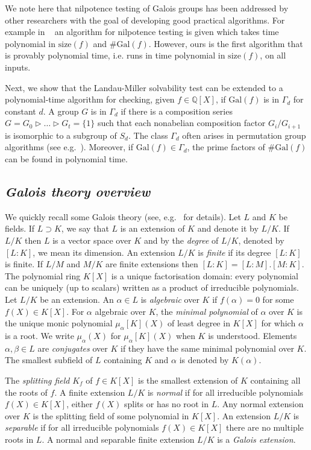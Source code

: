 \documentclass{llncs}
\newcommand{\size}[1]{{\ensuremath{\mathrm{size}\left(#1\right)}}}
\newcommand{\Gal}[1]{{\ensuremath{\mathrm{Gal}\left(#1\right)}}}
\newcommand{\Q}{\ensuremath{\mathbb{Q}}}
\begin{document}
We note here that nilpotence testing of Galois groups has been
addressed by other researchers with the goal of developing good
practical algorithms. For example in
~\cite{pilar2003deciding-nilpotence} an algorithm for nilpotence
testing is given which takes time polynomial in $\size{f}$ and $\#
\Gal{f}$. However, ours is the first algorithm that is provably
polynomial time, i.e. runs in time polynomial in $\size{f}$, on all
inputs.

Next, we show that the Landau-Miller solvability test can be extended
to a polynomial-time algorithm for checking, given $f\in\Q[X]$, if
$\Gal{f}$ is in $\Gamma_d$ for constant $d$. A group $G$ is in
$\Gamma_d$ if there is a composition series $G = G_0 \rhd \ldots \rhd
G_t = \{ 1 \}$ such that each nonabelian composition factor
$G_i/G_{i+1}$ is isomorphic to a subgroup of $S_d$. The class
$\Gamma_d$ often arises in permutation group algorithms (see
e.g.~\cite{luks82bounded}). Moreover, if $\Gal{f}\in\Gamma_d$, the
prime factors of $\# \Gal{f}$ can be found in polynomial time.

\subsection{\it Galois theory overview}

We quickly recall some Galois theory (see, e.g.~\cite{lang:algebra}
for details).  Let $L$ and $K$ be fields. If $L\supset K$, we say that
$L$ is an extension of $K$ and denote it by $L/K$. If $L/K$ then $L$
is a vector space over $K$ and by the \emph{degree} of $L/K$, denoted
by $[L:K]$, we mean its dimension. An extension $L/K$ is \emph{finite}
if its degree $[L:K]$ is finite. If $L/M$ and $M/K$ are finite
extensions then $[L:K] = [L:M].[M:K]$. The polynomial ring $K[X]$ is a
unique factorisation domain: every polynomial can be uniquely (up to
scalars) written as a product of irreducible polynomials. Let $L/K$ be
an extension. An $\alpha \in L$ is \emph{algebraic} over $K$ if
$f(\alpha)=0$ for some $f(X)\in K[X]$. For $\alpha$ algebraic over
$K$, the \emph{minimal polynomial} of $\alpha$ over $K$ is the unique
monic polynomial $\mu_\alpha[K](X)$ of least degree in $K[X]$ for
which $\alpha$ is a root. We write $\mu_\alpha(X)$ for
$\mu_\alpha[K](X)$ when $K$ is understood. Elements $\alpha,\beta\in
L$ are \emph{conjugates} over $K$ if they have the same minimal
polynomial over $K$. The smallest subfield of $L$ containing $K$ and
$\alpha$ is denoted by $K(\alpha)$.

The \emph{splitting field} $K_f$ of $f\in K[X]$ is the smallest
extension of $K$ containing all the roots of $f$. A finite extension
$L/K$ is \emph{normal} if for all irreducible polynomials $f(X)\in
K[X]$, either $f(X)$ splits or has no root in $L$. Any normal
extension over $K$ is the splitting field of some polynomial in
$K[X]$. An extension $L/K$ is \emph{separable} if for all irreducible
polynomials $f(X) \in K[X]$ there are no multiple roots in $L$.  A
normal and separable finite extension $L/K$ is a \emph{Galois
  extension}.
\end{document}
